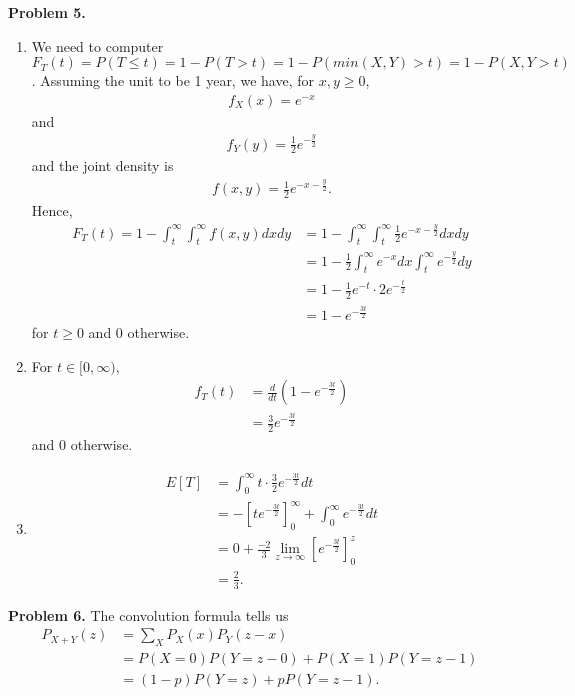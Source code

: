 \documentclass{article}
\begin{document}
\textbf{Problem 5.}
\begin{enumerate}[label={(\alph*)}]
    \item 
    We need to computer $F_T(t)=P(T\le t)=1-P(T>t)=1-P(min(X,Y)>t)=1-P(X,Y>t)$. Assuming the unit to be 1 year, we have, for $x,y\ge 0$,
    \begin{align}
        f_X(x)=e^{-x}
    \end{align}
    and
    \begin{align}
        f_Y(y)=\frac{1}{2}e^{-\frac{y}{2}}
    \end{align}
    and the joint density is 
    \begin{align}
        f(x,y)=\frac{1}{2}e^{-x-\frac{y}{2}}.
    \end{align}
    Hence, 
    \begin{align}
        F_T(t)=1-\int_{t}^{\infty}\int_{t}^{\infty}f(x,y)dxdy & = 1-\int_{t}^{\infty}\int_{t}^{\infty}\frac{1}{2}e^{-x-\frac{y}{2}}dxdy \\
        & = 1-\frac{1}{2}\int_{t}^{\infty}e^{-x}dx\int_{t}^{\infty}e^{-\frac{y}{2}}dy \\
        & = 1-\frac{1}{2}e^{-t}\cdot 2e^{-\frac{t}{2}} \\
        & = 1-e^{-\frac{3t}{2}} 
    \end{align}
    for $t \ge 0$ and 0 otherwise.

    \item
    For $t\in [0,\infty)$,
    \begin{align}
        f_T(t)&=\frac{d}{dt}\left(1-e^{-\frac{3t}{2}}\right) \\
        &=\frac{3}{2}e^{-\frac{3t}{2}}
    \end{align}
    and 0 otherwise.
    \item 
    \begin{align}
        E[T]&=\int_{0}^{\infty}t\cdot \frac{3}{2}e^{-\frac{3t}{2}}dt \\
        &=-\left[te^{-\frac{3t}{2}}\right]_{0}^{\infty}+\int_{0}^{\infty}e^{-\frac{3t}{2}}dt \\
        & = 0+\frac{-2}{3}\lim_{z\rightarrow\infty}\left[e^{-\frac{3t}{2}}\right]_0^z \\
        & = \frac{2}{3}.
    \end{align}
\end{enumerate}
\bigbreak

\textbf{Problem 6.}
The convolution formula tells us
\begin{align}
    P_{X+Y}(z) & = \sum_{X}P_X(x)P_Y(z-x) \\
    & = P(X=0)P(Y=z-0)+P(X=1)P(Y=z-1) \\
    & = (1-p)P(Y=z)+pP(Y=z-1).
\end{align}
\end{document}
